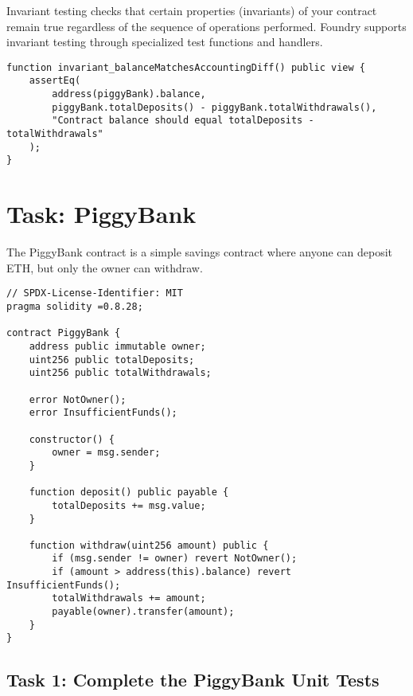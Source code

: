 \documentclass[12pt]{article}
\begin{document}
Invariant testing checks that certain properties (invariants) of your contract remain true regardless of the sequence of operations performed. Foundry supports invariant testing through specialized test functions and handlers.

\noindent \begin{minipage}{\textwidth}
\begin{lstlisting}[language=Solidity]
function invariant_balanceMatchesAccountingDiff() public view {
    assertEq(
        address(piggyBank).balance,
        piggyBank.totalDeposits() - piggyBank.totalWithdrawals(),
        "Contract balance should equal totalDeposits - totalWithdrawals"
    );
}
\end{lstlisting}
\end{minipage}

\section*{Task: PiggyBank}

The PiggyBank contract is a simple savings contract where anyone can deposit ETH, but only the owner can withdraw. 

\noindent \begin{minipage}{\textwidth}
\begin{lstlisting}[language=Solidity]
// SPDX-License-Identifier: MIT
pragma solidity =0.8.28;

contract PiggyBank {
    address public immutable owner;
    uint256 public totalDeposits;
    uint256 public totalWithdrawals;
    
    error NotOwner();
    error InsufficientFunds();
    
    constructor() {
        owner = msg.sender;
    }
    
    function deposit() public payable {
        totalDeposits += msg.value;
    }
  
    function withdraw(uint256 amount) public {
        if (msg.sender != owner) revert NotOwner();
        if (amount > address(this).balance) revert InsufficientFunds();
        totalWithdrawals += amount;
        payable(owner).transfer(amount);
    }
}
\end{lstlisting}
\end{minipage}

\subsection*{Task 1: Complete the PiggyBank Unit Tests}
\end{document}
